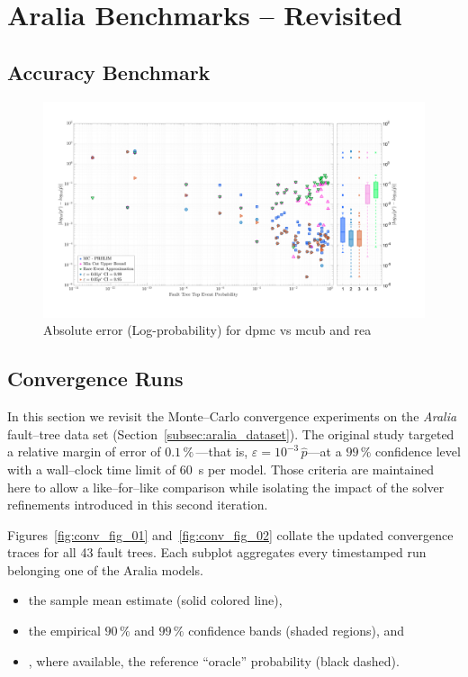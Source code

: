 \chapter{Aralia Benchmarks -- Revisited}

\section{Accuracy Benchmark}
\begin{landscape}
\begin{figure}[p]
    \centering
    \includegraphics[width=1.38\textwidth]{figs/aralia/rel_log_error_vs_prob.png}
    \caption{Absolute error (Log-probability) for \acrfull{dpmc} vs \acrfull{mcub} and \acrfull{rea}}
    \label{fig:canopy_rel_error_plot_revies}
\end{figure}
\end{landscape}

\section{Convergence Runs}
In this section we revisit the Monte--Carlo convergence experiments on the \emph{Aralia} fault--tree data set (Section~\ref{subsec:aralia_dataset}).  The original study targeted a relative margin of error of $0.1\,\%$\,---that is, $\varepsilon = 10^{-3}\,\hat{p}$---at a $99\,\%$ confidence level with a wall--clock time limit of 60~s per model.  Those criteria are maintained here to allow a like--for--like comparison while isolating the impact of the solver refinements introduced in this second iteration.

Figures~\ref{fig:conv_fig_01} and~\ref{fig:conv_fig_02} collate the updated convergence traces for all 43 fault trees.  Each subplot aggregates every timestamped run belonging one of the Aralia models.
\begin{itemize}
  \item the sample mean estimate (solid colored line),
  \item the empirical $90\,\%$ and $99\,\%$ confidence bands (shaded regions), and
  \item, where available, the reference ``oracle'' probability (black dashed).
\end{itemize}

